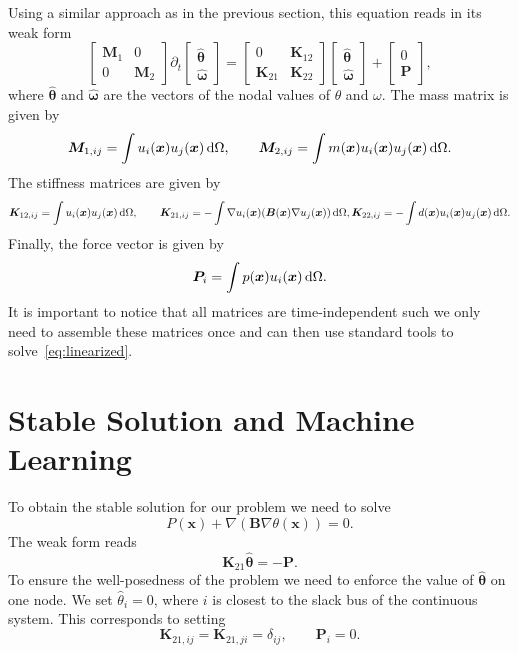 \documentclass[aps,pre]{revtex4-2}
\begin{document}
Using a similar approach as in the previous section, this equation reads in its weak form
\begin{equation}\label{eq:linearized}
	\begin{bmatrix}\bm{M}_1 & 0\\ 0 & \bm{M}_{2}\end{bmatrix}\partial_t\begin{bmatrix}\hat{\bm{\theta}} \\ \hat{\bm{\omega}}\end{bmatrix} = \begin{bmatrix}0 & \bm{K}_{12}\\\bm{K}_{21}&\bm{K}_{22}\end{bmatrix}\begin{bmatrix}\hat{\bm{\theta}}\\\hat{\bm{\omega}}\end{bmatrix} + \begin{bmatrix}0\\\bm{P}\end{bmatrix},
\end{equation}
where $\hat{\bm{\theta}}$ and $\hat{\bm{\omega}}$ are the vectors of the nodal values of $\theta$ and $\omega$.
The mass matrix is given by
\begin{equation}
	\bm{M}_{1, ij} = \int u_i(\bm{x})u_j(\bm{x})\dl\Omega, \qquad \bm{M}_{2, ij} = \int m(\bm{x})u_i(\bm{x})u_j(\bm{x})\dl\Omega.
\end{equation}
The stiffness matrices are given by
\begin{equation}
	\bm{K}_{12, ij} = \int u_i(\bm{x})u_j(\bm{x})\dl\Omega,\qquad \bm{K}_{21, ij} = -\int\nabla u_i(\bm{x})(\bm{B}(\bm{x})\nabla u_j(\bm{x}))\dl\Omega,
	\bm{K}_{22, ij} = -\int d(\bm{x}) u_i(\bm{x})u_j(\bm{x})\dl\Omega.
\end{equation}
Finally, the force vector is given by
\begin{equation}
	\bm{P}_i = \int p(\bm{x})u_i(\bm{x})\dl\Omega.
\end{equation}
It is important to notice that all matrices are time-independent such we only need to assemble these matrices once and can then use standard tools to solve~\eqref{eq:linearized}.

\section{Stable Solution and Machine Learning}
To obtain the stable solution for our problem we need to solve
\begin{equation}
	P(\bm{x}) + \nabla(\bm{B}\nabla\theta(\bm{x})) = 0.
\end{equation}
The weak form reads
\begin{equation}
	\bm{K}_{21} \hat{\bm{\theta}} = -\bm{P}.
\end{equation}
To ensure the well-posedness of the problem we need to enforce the value of $\hat{\bm{\theta}}$ on one node.
We set $\hat{\theta}_i = 0$, where $i$ is closest to the slack bus of the continuous system.
This corresponds to setting
\begin{equation}
	\bm{K}_{21, ij} = \bm{K}_{21, ji} = \delta_{ij}, \qquad \bm{P}_i = 0.
\end{equation}
\end{document}
